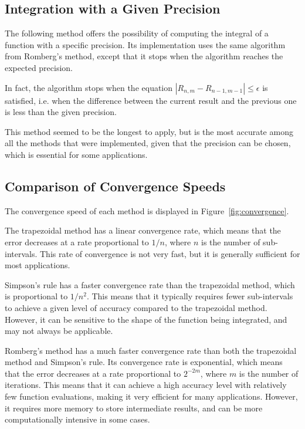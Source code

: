\subsection{Integration with a Given Precision}

The following method offers the possibility of computing the integral of a function with a specific precision.
Its implementation uses the same algorithm from Romberg's method, except that it stops when the algorithm reaches the expected precision.

In fact, the algorithm stops when the equation $\left| R_{n, m} - R_{n - 1, m - 1} \right| \leq \epsilon$ is satisfied,
i.e. when the difference between the current result and the previous one is less than the given precision.

This method seemed to be the longest to apply, but is the most accurate among all the methods that were implemented, given that the precision can be chosen, which is essential for some applications.


\subsection{Comparison of Convergence Speeds}

The convergence speed of each method is displayed in Figure~\ref{fig:convergence}.

\medbreak

The trapezoidal method has a linear convergence rate, which means that the error decreases at a rate proportional to $1/n$, where $n$ is the number of sub-intervals.
This rate of convergence is not very fast, but it is generally sufficient for most applications.

\smallbreak
Simpson's rule has a faster convergence rate than the trapezoidal method, which is proportional to $1/n^2$.
This means that it typically requires fewer sub-intervals to achieve a given level of accuracy compared to the trapezoidal method. However, it can be sensitive to the shape of the function being integrated, and may not always be applicable.

\smallbreak
Romberg's method has a much faster convergence rate than both the trapezoidal method and Simpson's rule.
Its convergence rate is exponential, which means that the error decreases at a rate proportional to $2^{-2m}$, where $m$ is the number of iterations.
This means that it can achieve a high accuracy level with relatively few function evaluations, making it very efficient for many applications.
However, it requires more memory to store intermediate results, and can be more computationally intensive in some cases.

